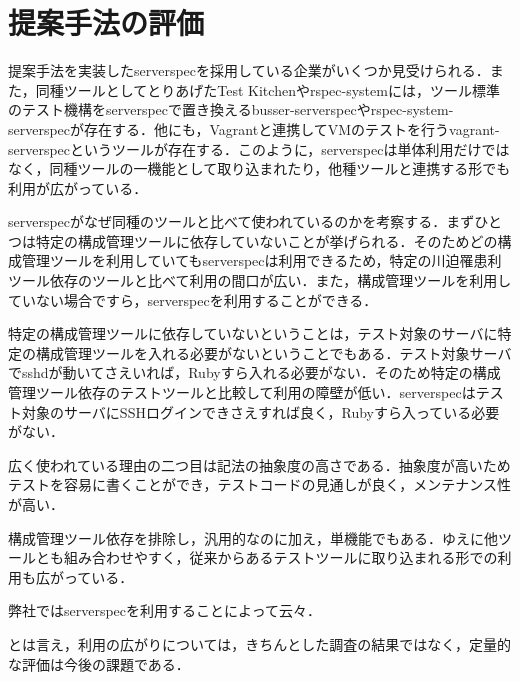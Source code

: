 \section{提案手法の評価}

提案手法を実装したserverspecを採用している企業がいくつか見受けられる．また，同種ツールとしてとりあげたTest Kitchenやrspec-systemには，ツール標準のテスト機構をserverspecで置き換えるbusser-serverspecやrspec-system-serverspecが存在する．他にも，Vagrantと連携してVMのテストを行うvagrant-serverspecというツールが存在する．このように，serverspecは単体利用だけではなく，同種ツールの一機能として取り込まれたり，他種ツールと連携する形でも利用が広がっている．

serverspecがなぜ同種のツールと比べて使われているのかを考察する．まずひとつは特定の構成管理ツールに依存していないことが挙げられる．そのためどの構成管理ツールを利用していてもserverspecは利用できるため，特定の川迫罹患利ツール依存のツールと比べて利用の間口が広い．また，構成管理ツールを利用していない場合ですら，serverspecを利用することができる．

特定の構成管理ツールに依存していないということは，テスト対象のサーバに特定の構成管理ツールを入れる必要がないということでもある．テスト対象サーバでsshdが動いてさえいれば，Rubyすら入れる必要がない．そのため特定の構成管理ツール依存のテストツールと比較して利用の障壁が低い．serverspecはテスト対象のサーバにSSHログインできさえすれば良く，Rubyすら入っている必要がない．

広く使われている理由の二つ目は記法の抽象度の高さである．抽象度が高いためテストを容易に書くことができ，テストコードの見通しが良く，メンテナンス性が高い．

構成管理ツール依存を排除し，汎用的なのに加え，単機能でもある．ゆえに他ツールとも組み合わせやすく，従来からあるテストツールに取り込まれる形での利用も広がっている．

弊社ではserverspecを利用することによって云々．

とは言え，利用の広がりについては，きちんとした調査の結果ではなく，定量的な評価は今後の課題である．
